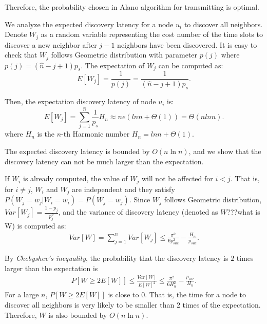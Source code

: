 Therefore, the probability chosen in Alano algorithm for transmitting is optimal.

We analyze the expected discovery latency for a node $u_i$ to discover all neighbors. Denote $W_j$ as a random variable representing the cost number of the time slots to discover a new neighbor after $j-1$ neighbors have been discovered. It is easy to check that $W_j$ follows Geometric distribution with parameter $p(j)$ where $p(j)=(\hat{n}-j+1)p_s$\cite{XX}. The expectation
of $W_j$ can be computed as:
$$
E[W_j]=\frac{1}{p(j)}=\frac{1}{(\hat{n}-j+1)p_s}.
$$

Then, the expectation discovery latency of node $u_i$ is:
$$
E[W_j] = \sum_{j=1}^{\hat{n}}\frac{1}{p_s}H_n \approx ne(lnn + \Theta(1)) = \Theta(nlnn).
$$
where $H_n$ is the $n$-th Harmonic number $H_n = lnn + \Theta(1)$.


The expected discovery latency is bounded by $O(n\ln n)$, and we show that the discovery latency can not be much larger than the expectation.

If $W_i$ is already computed, the value of $W_j$ will not be affected for $i<j$. That is, for $i\ne j$, $W_i$ and $W_j$ are independent and they satisfy $P(W_j=w_j|W_i=w_i)=P(W_j=w_j)$. Since $W_j$ follows Geometric distribution, $Var[W_j]=\frac{1-p_j}{p_j^2}$, and the variance of discovery latency (denoted as $W$???what is W) is computed as:
\begin{displaymath}
\begin{split}
 Var[W] %
 =\sum_{j=1}^{n}Var[W_j]
 \le\frac{\pi^2}{6p_{suc}^2}-\frac{H_n}{p_{suc}}.
\end{split}
\end{displaymath}

By \emph{Chebyshev's inequality}, the probability that the discovery latency is $2$ times larger than the expectation is
\begin{displaymath}
\begin{split}
P[W\ge2E[W]]%
\le\frac{Var[W]}{E[W]^2}
\le\frac{\pi^2}{6H_{n}^2}-\frac{p_{suc}}{H_n}.
\end{split}
\end{displaymath}
For a large $n$, $P[W\ge2E[W]]$ is close to $0$. That is, the time for a node to discover all neighbors is very likely to be smaller than $2$ times of the expectation. Therefore, $W$ is also bounded by $O(n\ln n)$.

